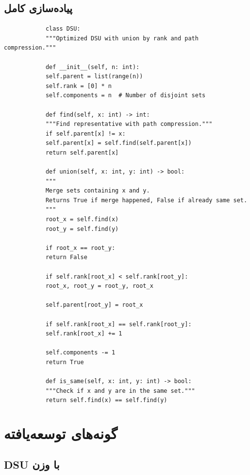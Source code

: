 \documentclass{matinbook}
\begin{document}
    \subsection{پیاده‌سازی کامل}
    
    \begin{latin}
        \begin{verbatim}
            class DSU:
            """Optimized DSU with union by rank and path compression."""
            
            def __init__(self, n: int):
            self.parent = list(range(n))
            self.rank = [0] * n
            self.components = n  # Number of disjoint sets
            
            def find(self, x: int) -> int:
            """Find representative with path compression."""
            if self.parent[x] != x:
            self.parent[x] = self.find(self.parent[x])
            return self.parent[x]
            
            def union(self, x: int, y: int) -> bool:
            """
            Merge sets containing x and y.
            Returns True if merge happened, False if already same set.
            """
            root_x = self.find(x)
            root_y = self.find(y)
            
            if root_x == root_y:
            return False
            
            if self.rank[root_x] < self.rank[root_y]:
            root_x, root_y = root_y, root_x
            
            self.parent[root_y] = root_x
            
            if self.rank[root_x] == self.rank[root_y]:
            self.rank[root_x] += 1
            
            self.components -= 1
            return True
            
            def is_same(self, x: int, y: int) -> bool:
            """Check if x and y are in the same set."""
            return self.find(x) == self.find(y)
        \end{verbatim}
    \end{latin}
    \label{code:dsu-optimized}
    
    \section{گونه‌های توسعه‌یافته}
    
    \subsection{DSU با وزن}
    
\end{document}
